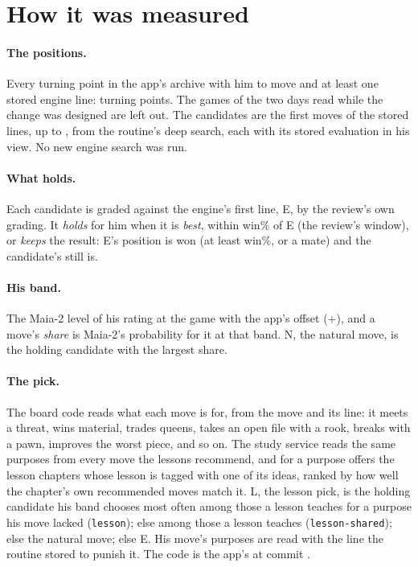 \documentclass[11pt]{article}
\begin{document}
\section{How it was measured}

\paragraph{The positions.} Every turning point in the app's archive with him to move and at least
one stored engine line: \Examined{} turning points. The \SkippedGames{} games of the two days read
while the change was designed are left out\SkippedLater{}. The candidates are the first moves of the stored
lines, up to \MaxCandidates{}, from the routine's deep search, each with its stored evaluation in
his view.
No new engine search was run.

\paragraph{What holds.} Each candidate is graded against the engine's first line, E, by the
review's own grading. It \emph{holds} for him when it is \emph{best}, within \Window{} win\% of
E (the review's window), or \emph{keeps} the result: E's position is won (at least \KeptWon{}
win\%, or a mate) and the candidate's still is.

\paragraph{His band.} The Maia-2 level of his rating at the game with the app's offset
(+\Offset), and a move's \emph{share} is Maia-2's probability for it at that band. N, the natural
move, is the holding candidate with the largest share.

\paragraph{The pick.} The board code reads what each move is for, from the move and its line:
it meets a threat, wins material, trades queens, takes an open file with a rook, breaks with a
pawn, improves the worst piece, and so on. The study service reads the same purposes from every
move the lessons recommend, and for a purpose offers the lesson chapters whose lesson is tagged
with one of its ideas, ranked by how well the chapter's own recommended moves match it. L, the
lesson pick, is the holding candidate his band chooses most often among those a lesson teaches
for a purpose his move lacked (\texttt{lesson}); else among those a lesson teaches
(\texttt{lesson-shared}); else the natural move; else E. His move's purposes are read with the
line the routine stored to punish it. The code is the app's at commit \texttt{\AppCommit}.
\end{document}
